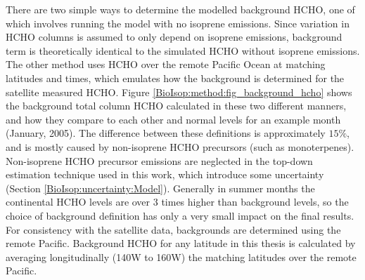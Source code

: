     There are two simple ways to determine the modelled background HCHO, one of which involves running the model with no isoprene emissions. 
    Since variation in HCHO columns is assumed to only depend on isoprene emissions,  background term is theoretically identical to the simulated HCHO without isoprene emissions.
    The other method uses HCHO over the remote Pacific Ocean at matching latitudes and times, which emulates how the background is determined for the satellite measured HCHO.
    Figure \ref{BioIsop:method:fig_background_hcho} shows the background total column HCHO calculated in these two different manners, and how they compare to each other and normal levels for an example month (January, 2005).
    The difference between these definitions is approximately $15\%$, and is mostly caused by non-isoprene HCHO precursors (such as monoterpenes).
    Non-isoprene HCHO precursor emissions are neglected in the top-down estimation technique used in this work, which introduce some uncertainty (Section \ref{BioIsop:uncertainty:Model}).
    Generally in summer months the continental HCHO levels are over 3 times higher than background levels, so the choice of background definition has only a very small impact on the final results.
    For consistency with the satellite data, backgrounds are determined using the remote Pacific.
    Background HCHO for any latitude in this thesis is calculated by averaging longitudinally (140\degr W to 160\degr W) the matching latitudes over the remote Pacific.
    
    
    
